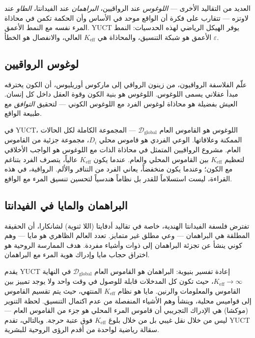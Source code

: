 \documentclass[12pt,a4paper]{article}
\begin{document}
	العديد من التقاليد الأخرى — \emph{اللوغوس} عند الرواقيين، \emph{البراهمان} عند الفيدانتا، \emph{الطاو} عند لاوتزه — تتقارب على فكرة أن الواقع موحد في الأساس وأن الحكمة تكمن في محاذاة المرء نفسه مع النمط الأعمق. YUCT يوفر الهيكل الرياضي لهذه الحدسيات: النمط الأعمق هو شبكة التنسيق، والمحاذاة هي \(K_{\mathrm{eff}}\) العالي، والانفصال هو الخطأ \(\varepsilon\).
	
	\subsection{لوغوس الرواقيين}
	
	علّم الفلاسفة الرواقيون، من زينون الرواقي إلى ماركوس أوريليوس، أن الكون يخترقه مبدأ عقلاني يسمى اللوغوس. اللوغوس هو بنية الكون وقوة العقل داخل كل إنسان. العيش بفضيلة هو محاذاة لوغوس الفرد مع اللوغوس الكوني — لتحقيق \emph{التوافق} مع طبيعة الواقع.
	
	في YUCT، اللوغوس هو القاموس العام \(\mathcal{D}_{\text{global}}\) — المجموعة الكاملة لكل الحالات الممكنة وعلاقاتها. الوعي الفردي هو قاموس محلي \(D_i\)، مجموعة جزئية من القاموس العام. مشروع الرواقيين المتمثل في محاذاة الذات مع اللوغوس هو الواجب الأخلاقي لتعظيم \(K_{\mathrm{eff}}\) بين القاموس المحلي والعام. عندما يكون \(K_{\mathrm{eff}}\) عالياً، يتصرف الفرد بتناغم مع الكون؛ وعندما يكون منخفضاً، يعاني الفرد من التنافر والألم. الرواقية، في هذه القراءة، ليست استسلاماً للقدر بل نظاماً هندسياً لتحسين تنسيق المرء مع الواقع.
	
	\subsection{البراهمان والمايا في الفيدانتا}
	
	تفترض فلسفة الفيدانتا الهندية، خاصة في تقاليد أدفايتا (اللا ثنوية) لشانكارا، أن الحقيقة المطلقة هي البراهمان — وعي مطلق غير متمايز. تعدد العالم الظاهري هو مايا — وهم كوني ينشأ عن تجزئة البراهمان إلى ذوات وأشياء مفردة. هدف الممارسة الروحية هو اختراق حجاب مايا وإدراك هوية المرء مع البراهمان.
	
	يقدم YUCT إعادة تفسير بنيوية: البراهمان هو القاموس العام \(\mathcal{D}_{\text{global}}\) في النهاية \(K_{\mathrm{eff}} \to \infty\)، حيث تكون كل المدخلات قابلة للوصول في وقت واحد ولا يوجد تمييز بين القاموس والمعلومات والرنين. مايا هو نظام \(K_{\mathrm{eff}}\) المنتهي، حيث يتم تقسيم القاموس إلى قواميس محلية، وينشأ وهم الأشياء المنفصلة من عدم اكتمال التنسيق. لحظة التنوير (موكشا) هي الإدراك التجريبي أن قاموس المرء المحلي هو جزء من القاموس العام — ليس من خلال نقل غيبي بل من خلال بلوغ \(K_{\mathrm{eff}}\) فوق عتبة حرجة. وبالتالي، تقدم YUCT سقالة رياضية لواحدة من أقدم الرؤى الروحية للبشرية.
	
\end{document}
